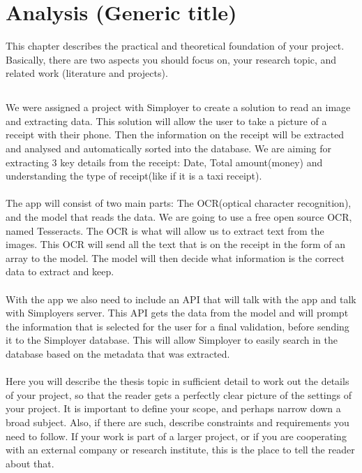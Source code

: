 \cleardoublepage
\chapter{Analysis (Generic title)}
\label{ch:analysis}

This chapter describes the practical and theoretical foundation of your project.
Basically, there are two aspects you should focus on, your research topic, and related work (literature and projects).

\section{}\label{sec:research-topic-(generic-title)}

We were assigned a project with Simployer to create a solution to read an image and extracting data.
This solution will allow the user to take a picture of a receipt with their phone.
Then the information on the receipt will be extracted and analysed and automatically sorted into the database.
We are aiming for extracting 3 key details from the receipt: Date, Total amount(money) and understanding the type of receipt(like if it is a taxi receipt).\\
\\
The app will consist of two main parts: The OCR(optical character recognition), and the model that reads the data.
We are going to use a free open source OCR, named Tesseracts.
The OCR is what will allow us to extract text from the images.
This OCR will send all the text that is on the receipt in the form of an array to the model.
The model will then decide what information is the correct data to extract and keep.\\
\\
With the app we also need to include an API that will talk with the app and talk with Simployers server.
This API gets the data from the model and will prompt the information that is selected for the user for a final
validation, before sending it to the Simployer database.
This will allow Simployer to easily search in the database based on the metadata that was extracted.\\
\\
Here you will describe the thesis topic in sufficient detail to work out the details of your project, so that the reader gets a perfectly clear picture of the settings of your project.
It is important to define your scope, and perhaps narrow down a broad subject.
Also, if there are such, describe constraints and requirements you need to follow.
If your work is part of a larger project, or if you are cooperating with an external company or research institute, this is the place to tell the reader about that.


